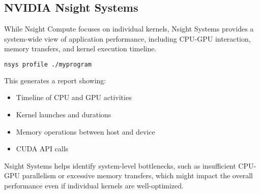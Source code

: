\subsection{NVIDIA Nsight Systems}

While Nsight Compute focuses on individual kernels, Nsight Systems provides a system-wide view of application performance, including CPU-GPU interaction, memory transfers, and kernel execution timeline.

\begin{lstlisting}[language=bash]
nsys profile ./myprogram
\end{lstlisting}

This generates a report showing:
\begin{itemize}
    \item Timeline of CPU and GPU activities
    \item Kernel launches and durations
    \item Memory operations between host and device
    \item CUDA API calls
\end{itemize}

Nsight Systems helps identify system-level bottlenecks, such as insufficient CPU-GPU parallelism or excessive memory transfers, which might impact the overall performance even if individual kernels are well-optimized.

